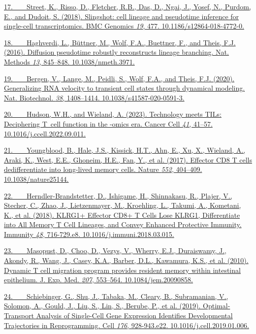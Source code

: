 \href{https://sciwheel.com/work/bibliography/5496398}{17.~  Street, K.,
Risso, D., Fletcher, R.B., Das, D., Ngai, J., Yosef, N., Purdom, E., and
Dudoit, S. (2018). Slingshot: cell lineage and pseudotime inference for
single-cell transcriptomics. BMC Genomics \emph{19}, 477.
10.1186/s12864-018-4772-0.}

\href{https://sciwheel.com/work/bibliography/2919207}{18.~  Haghverdi,
L., Büttner, M., Wolf, F.A., Buettner, F., and Theis, F.J. (2016).
Diffusion pseudotime robustly reconstructs lineage branching. Nat.
Methods \emph{13}, 845--848. 10.1038/nmeth.3971.}

\href{https://sciwheel.com/work/bibliography/9367004}{19.~  Bergen, V.,
Lange, M., Peidli, S., Wolf, F.A., and Theis, F.J. (2020). Generalizing
RNA velocity to transient cell states through dynamical modeling. Nat.
Biotechnol. \emph{38}, 1408--1414. 10.1038/s41587-020-0591-3.}

\href{https://sciwheel.com/work/bibliography/13729536}{20.~  Hudson,
W.H., and Wieland, A. (2023). Technology meets TILs: Deciphering T~cell
function in the -omics era. Cancer Cell \emph{41}, 41--57.
10.1016/j.ccell.2022.09.011.}

\href{https://sciwheel.com/work/bibliography/4615200}{21.~  Youngblood,
B., Hale, J.S., Kissick, H.T., Ahn, E., Xu, X., Wieland, A., Araki, K.,
West, E.E., Ghoneim, H.E., Fan, Y., et al. (2017). Effector CD8 T cells
dedifferentiate into long-lived memory cells. Nature \emph{552},
404--409. 10.1038/nature25144.}

\href{https://sciwheel.com/work/bibliography/5308353}{22.~  Herndler-Brandstetter,
D., Ishigame, H., Shinnakasu, R., Plajer, V., Stecher, C., Zhao, J.,
Lietzenmayer, M., Kroehling, L., Takumi, A., Kometani, K., et al.
(2018). KLRG1+ Effector CD8+ T Cells Lose KLRG1, Differentiate into All
Memory T Cell Lineages, and Convey Enhanced Protective Immunity.
Immunity \emph{48}, 716-729.e8. 10.1016/j.immuni.2018.03.015.}

\href{https://sciwheel.com/work/bibliography/637212}{23.~  Masopust, D.,
Choo, D., Vezys, V., Wherry, E.J., Duraiswamy, J., Akondy, R., Wang, J.,
Casey, K.A., Barber, D.L., Kawamura, K.S., et al. (2010). Dynamic T cell
migration program provides resident memory within intestinal epithelium.
J. Exp. Med. \emph{207}, 553--564. 10.1084/jem.20090858.}

\href{https://sciwheel.com/work/bibliography/6347423}{24.~  Schiebinger,
G., Shu, J., Tabaka, M., Cleary, B., Subramanian, V., Solomon, A.,
Gould, J., Liu, S., Lin, S., Berube, P., et al. (2019).
Optimal-Transport Analysis of Single-Cell Gene Expression Identifies
Developmental Trajectories in Reprogramming. Cell \emph{176},
928-943.e22. 10.1016/j.cell.2019.01.006.}

